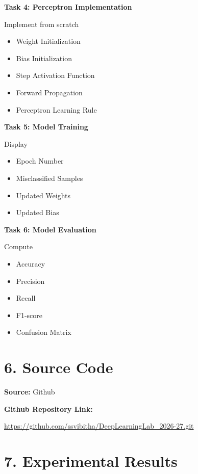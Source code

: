 \documentclass[11pt]{article}
\begin{document}
\vspace{2mm}

\textbf{Task 4: Perceptron Implementation}

Implement from scratch

\begin{itemize}
\item Weight Initialization
\item Bias Initialization
\item Step Activation Function
\item Forward Propagation
\item Perceptron Learning Rule
\end{itemize}

\vspace{2mm}

\textbf{Task 5: Model Training}

Display

\begin{itemize}
\item Epoch Number
\item Misclassified Samples
\item Updated Weights
\item Updated Bias
\end{itemize}

\vspace{2mm}

\textbf{Task 6: Model Evaluation}

Compute

\begin{itemize}
\item Accuracy
\item Precision
\item Recall
\item F1-score
\item Confusion Matrix
\end{itemize}

\section*{6. Source Code}

\textbf{Source:} Github

\textbf{Github Repository Link:}

\url{https://github.com/ssvibitha/DeepLearningLab_2026-27.git}
\section*{7. Experimental Results}
\end{document}
